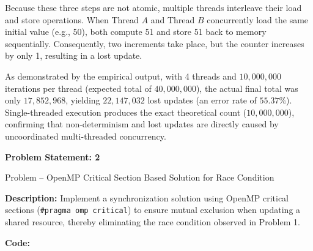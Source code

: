 \documentclass[12pt]{article}
\begin{document}
Because these three steps are not atomic, multiple threads interleave their load and store operations. When Thread $A$ and Thread $B$ concurrently load the same initial value (e.g., 50), both compute 51 and store 51 back to memory sequentially. Consequently, two increments take place, but the counter increases by only 1, resulting in a lost update.

As demonstrated by the empirical output, with 4 threads and $10{,}000{,}000$ iterations per thread (expected total of $40{,}000{,}000$), the actual final total was only $17{,}852{,}968$, yielding $22{,}147{,}032$ lost updates (an error rate of $55.37\%$). Single-threaded execution produces the exact theoretical count ($10{,}000{,}000$), confirming that non-determinism and lost updates are directly caused by uncoordinated multi-threaded concurrency.

\newpage


\textbf{Problem Statement: 2}

Problem -- OpenMP Critical Section Based Solution for Race Condition

\vspace{0.2cm}
\textbf{Description:} Implement a synchronization solution using OpenMP critical sections (\texttt{\#pragma omp critical}) to ensure mutual exclusion when updating a shared resource, thereby eliminating the race condition observed in Problem 1.

\vspace{0.3cm}
\textbf{Code:}
\end{document}
